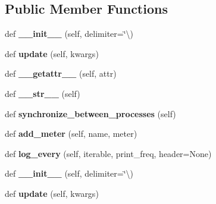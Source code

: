 \subsection*{Public Member Functions}
\begin{DoxyCompactItemize}
\item 
\mbox{\label{classutils_1_1MetricLogger_a59c07b109de104bdab791643a7b3619b}} 
def {\bfseries \+\_\+\+\_\+init\+\_\+\+\_\+} (self, delimiter=\char`\"{}\textbackslash{})
\item 
\mbox{\label{classutils_1_1MetricLogger_a7ff577d15013ac9ad358428fd7e6ac77}} 
def {\bfseries update} (self, kwargs)
\item 
\mbox{\label{classutils_1_1MetricLogger_ac83dc82a4b7c2f4078fdbbc7d75ed18b}} 
def {\bfseries \+\_\+\+\_\+getattr\+\_\+\+\_\+} (self, attr)
\item 
\mbox{\label{classutils_1_1MetricLogger_a7dbbefdb1b1e47db288d2c3384af11fe}} 
def {\bfseries \+\_\+\+\_\+str\+\_\+\+\_\+} (self)
\item 
\mbox{\label{classutils_1_1MetricLogger_aceb85ddf415836087996c28d6ed54456}} 
def {\bfseries synchronize\+\_\+between\+\_\+processes} (self)
\item 
\mbox{\label{classutils_1_1MetricLogger_a7ca17a885a17883f5301ee3bbe1682f6}} 
def {\bfseries add\+\_\+meter} (self, name, meter)
\item 
\mbox{\label{classutils_1_1MetricLogger_a52307f8e0e7d7036cec2034cb19dcbea}} 
def {\bfseries log\+\_\+every} (self, iterable, print\+\_\+freq, header=None)
\item 
\mbox{\label{classutils_1_1MetricLogger_a59c07b109de104bdab791643a7b3619b}} 
def {\bfseries \+\_\+\+\_\+init\+\_\+\+\_\+} (self, delimiter=\char`\"{}\textbackslash{})
\item 
\mbox{\label{classutils_1_1MetricLogger_a7ff577d15013ac9ad358428fd7e6ac77}} 
def {\bfseries update} (self, kwargs)

\end{DoxyCompactItemize}
